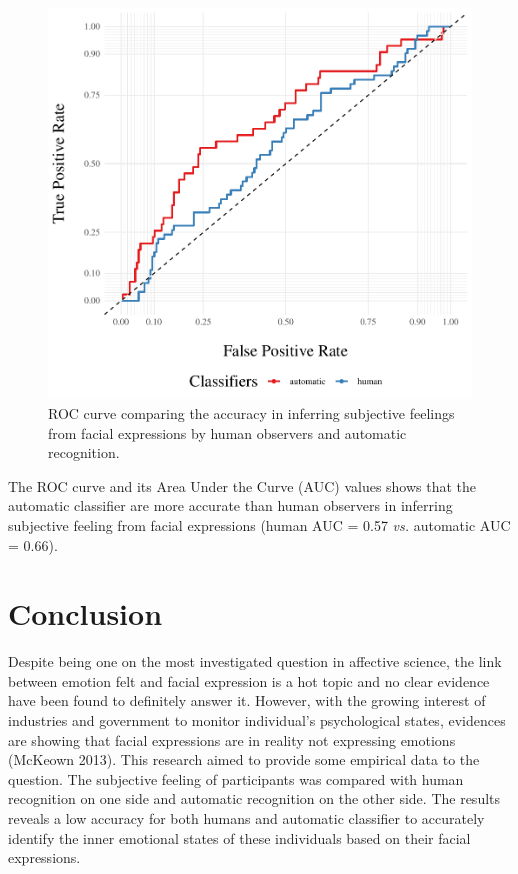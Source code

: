 \documentclass[conference,final,]{IEEEtran}
\makeatletter
\def\maxwidth{\ifdim\Gin@nat@width>\linewidth\linewidth
\else\Gin@nat@width\fi}
\let\Oldincludegraphics\includegraphics
\renewcommand{\includegraphics}[1]{\Oldincludegraphics[width=\maxwidth]{#1}}
\makeatother
\begin{document}
\begin{figure}
\centering
\includegraphics{ACII_2019_paper_files/figure-latex/roc-1.pdf}
\caption{ROC curve comparing the accuracy in inferring subjective
feelings from facial expressions by human observers and automatic
recognition.}
\end{figure}

The ROC curve and its Area Under the Curve (AUC) values shows that the
automatic classifier are more accurate than human observers in inferring
subjective feeling from facial expressions (human AUC = 0.57 \emph{vs.}
automatic AUC = 0.66).

\hypertarget{conclusion}{%
\section{Conclusion}\label{conclusion}}

Despite being one on the most investigated question in affective
science, the link between emotion felt and facial expression is a hot
topic and no clear evidence have been found to definitely answer it.
However, with the growing interest of industries and government to
monitor individual's psychological states, evidences are showing that
facial expressions are in reality not expressing emotions (McKeown
2013). This research aimed to provide some empirical data to the
question. The subjective feeling of participants was compared with human
recognition on one side and automatic recognition on the other side. The
results reveals a low accuracy for both humans and automatic classifier
to accurately identify the inner emotional states of these individuals
based on their facial expressions.
\end{document}
